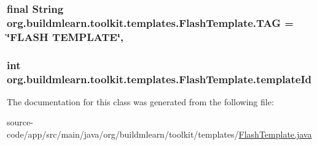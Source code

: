 \subsubsection[{\texorpdfstring{T\+AG}{TAG}}]{\setlength{\rightskip}{0pt plus 5cm}final String org.\+buildmlearn.\+toolkit.\+templates.\+Flash\+Template.\+T\+AG = \char`\"{}F\+L\+A\+SH T\+E\+M\+P\+L\+A\+TE\char`\"{}\hspace{0.3cm}{\ttfamily [static]}, {\ttfamily [private]}}\hypertarget{classorg_1_1buildmlearn_1_1toolkit_1_1templates_1_1FlashTemplate_a276db76cabb84d7edd7c28d3fb649039}{}\label{classorg_1_1buildmlearn_1_1toolkit_1_1templates_1_1FlashTemplate_a276db76cabb84d7edd7c28d3fb649039}
\subsubsection[{\texorpdfstring{template\+Id}{templateId}}]{\setlength{\rightskip}{0pt plus 5cm}int org.\+buildmlearn.\+toolkit.\+templates.\+Flash\+Template.\+template\+Id\hspace{0.3cm}{\ttfamily [private]}}\hypertarget{classorg_1_1buildmlearn_1_1toolkit_1_1templates_1_1FlashTemplate_a00df07dcf4f09799ccba120c9ef45e46}{}\label{classorg_1_1buildmlearn_1_1toolkit_1_1templates_1_1FlashTemplate_a00df07dcf4f09799ccba120c9ef45e46}


The documentation for this class was generated from the following file\+:\begin{DoxyCompactItemize}
\item 
source-\/code/app/src/main/java/org/buildmlearn/toolkit/templates/\hyperlink{FlashTemplate_8java}{Flash\+Template.\+java}\end{DoxyCompactItemize}
